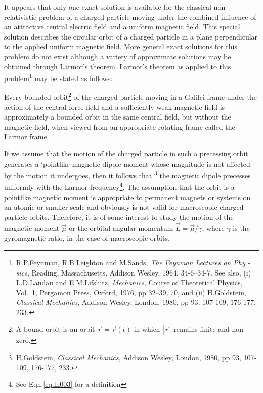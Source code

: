 It appears that only one exact solution is available for 
the 
classical non-relativistic problem of a  charged particle 
moving under the combined influence of an attractive 
central 
electric field and a uniform magnetic field. This special 
solution describes the circular orbit of a charged particle 
in a plane perpendicular to the applied uniform magnetic 
field. More general exact solutions for this problem do not 
exist although a variety of approximate solutions may be 
obtained through Larmor's theorem. Larmor's theorem as 
applied to this problem\footnote{R.P.Feynman, R.B.Leighton 
and M.Sands, \textsl{The Feynman Lectures on Phy -sics}, 
Reading, Massachusetts, Addison Wesley, 1964, 34-6--34-7. 
See also, (i) L.D.Landau and E.M.Lifshitz, 
\textsl{Mechanics}, Course of Theoretical Physics, Vol.~1, 
Pergamon Press, Oxford, 1976, pp 32--39, 70, and (ii) 
H.Goldstein, \textsl{Classical Mechanics}, Addison Wesley, 
London, 1980, pp 93, 107-109, 176-177, 233.} may  be 
stated as follows:
 
 Every bounded-orbit\footnote{A bound 
orbit is an orbit $\vec{r}=\vec{r}(t)$ in which $|\vec{r}|$ 
remains finite and non-zero.} of the charged particle 
moving 
in a Galilei frame under the action of the central force 
field and a sufficiently weak magnetic field is 
approximately a bounded orbit in the same central field, 
but 
without the magnetic field, when viewed from an appropriate 
rotating frame called the Larmor frame. 

If we assume that the motion of the charged particle in 
such 
a precessing orbit generates a `pointlike magnetic 
dipole-moment whose magnitude is not affected by the motion 
it undergoes, then it follows that \footnote{H.Goldstein, 
\textsl{Classical Mechanics}, Addison Wesley, London, 1980, 
pp 93, 107-109, 176-177, 233.} the magnetic dipole 
precesses 
uniformly with the Larmor frequency\footnote{See 
Eqn.\eqref{eq:ln003} for a definition}. The assumption that 
the orbit is a pointlike magnetic moment is appropriate to 
permanent magnets or systems on an atomic or smaller scale 
and obviously is not valid for macroscopic charged particle 
orbits. Therefore, it is of some interest to study the 
motion of the magnetic moment $\vec{\mu}$ or the orbital 
angular momentum $\vec{L} = \vec{\mu}/{\gamma}$,  where 
$\gamma$ is the gyromagnetic ratio, in the case of 
macroscopic orbits.

